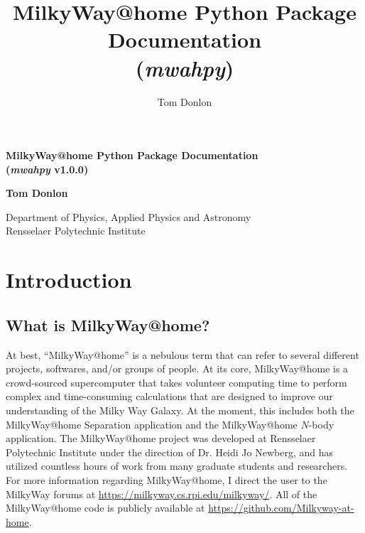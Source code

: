 \documentclass{article}
\author{Tom Donlon}
\title{MilkyWay@home Python Package Documentation \\ (\textit{mwahpy})}
\date{}
\begin{document}
\newcommand{\mwahpy}[0]{\textit{mwahpy }}

\begin{titlepage}
   \begin{center}
       \vspace*{5cm}

       \huge\textbf{MilkyWay@home Python Package Documentation \\ (\textit{mwahpy} v1.0.0)}

       \vspace{0.5cm}
        
            
       \vspace{1.5cm}

       \textbf{Tom Donlon}
            
       \vspace{0.8cm}
            
       Department of Physics, Applied Physics and Astronomy\\
       Rensselaer Polytechnic Institute
            
   \end{center}
\end{titlepage}

\newpage

\tableofcontents

\newpage

\section{Introduction}

\subsection{What is MilkyWay@home?}

At best, ``MilkyWay@home'' is a nebulous term that can refer to several different projects, softwares, and/or groups of people. At its core, MilkyWay@home is a crowd-sourced supercomputer that takes volunteer computing time to perform complex and time-consuming calculations that are designed to improve our understanding of the Milky Way Galaxy. At the moment, this includes both the MilkyWay@home Separation application and the MilkyWay@home $N$-body application. The MilkyWay@home project was developed at Rensselaer Polytechnic Institute under the direction of Dr. Heidi Jo Newberg, and has utilized countless hours of work from many graduate students and researchers. For more information regarding MilkyWay@home, I direct the user to the MilkyWay forums at \url{https://milkyway.cs.rpi.edu/milkyway/}. All of the MilkyWay@home code is publicly available at \url{https://github.com/Milkyway-at-home}. 
\end{document}
